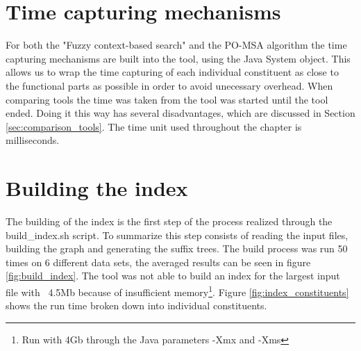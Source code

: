 \documentclass[thesis.tex]{subfiles}
\begin{document}
\section{Time capturing mechanisms}
For both the "Fuzzy context-based search" and the PO-MSA algorithm the time capturing mechanisms are built into the tool, using the Java System object. This allows us to wrap the time capturing of each individual constituent as close to the functional parts as possible in order to avoid unecessary overhead. When comparing tools the time was taken from the tool was started until the tool ended. Doing it this way has several disadvantages, which are discussed in Section \ref{sec:comparison_tools}. The time unit used throughout the chapter is milliseconds.
\section{Building the index}
\label{sec:building_the_index}
The building of the index is the first step of the process realized through the build\_index.sh script. To summarize this step consists of reading the input files, building the graph and generating the suffix trees. The build process was run 50 times on 6 different data sets, the averaged results can be seen in figure \ref{fig:build_index}. The tool was not able to build an index for the largest input file with ~4.5Mb because of insufficient memory\footnote{Run with 4Gb through the Java parameters -Xmx and -Xms}. Figure \ref{fig:index_constituents} shows the run time broken down into individual constituents.\\
\end{document}
